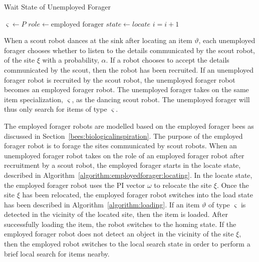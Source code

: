 \begin{algorithm}
\caption{Wait State of Unemployed Forager}
\label{algorithm:unemployedforager:locating}
\begin{algorithmic}[1]
	\State $\varsigma \gets P$
	\State {}
	\State $role \gets \text{employed forager}$
	\State $state \gets locate$
\EndIf
\State $i =i + 1$
\EndFunction
\end{algorithmic}
\end{algorithm}

When a scout robot dances at the sink after locating an item $\vartheta$, each unemployed forager chooses whether to listen to the details communicated by the scout robot, of the site $\xi$ with a probability, $\alpha$. If a robot chooses to accept the details communicated by the scout, then the robot has been recruited. If an unemployed forager robot is recruited by the scout robot, the unemployed forager robot becomes an employed forager robot. The unemployed forager takes on the same item specialization, $\varsigma$, as the dancing scout robot. The unemployed forager will thus only search for items of type $\varsigma$. 

The employed forager robots are modelled based on the employed forager bees as discussed in Section~\ref{bees:biologicalinspiration}. The purpose of the employed forager robot is to forage the sites communicated by scout robots. When an unemployed forager robot takes on the role of an employed forager robot after recruitment by a scout robot, the employed forager starts in the locate state, described in Algorithm~\ref{algorithm:employedforager:locating}. In the locate state, the employed forager robot uses the PI vector $\omega$ to relocate the site $\xi$. Once the site $\xi$ has been relocated, the employed forager robot switches into the load state has been described in Algorithm~\ref{algorithm:loading}. If an item $\vartheta$ of type $\varsigma$ is detected in the vicinity of the located site, then the item is loaded. After successfully loading the item, the robot switches to the homing state. If the employed forager robot does not detect an object in the vicinity of the site $\xi$, then the employed robot switches to the local search state in order to perform a brief local search for items nearby. 

